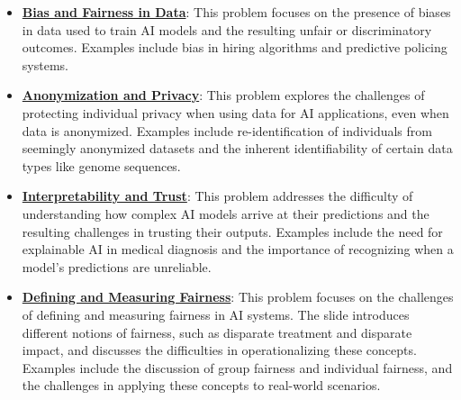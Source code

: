 \documentclass{article}%
\begin{document}
\begin{itemize}[leftmargin=*]%
\item \href{https://purdue.brightspace.com/d2l/common/assets/pdfjs-d2l-dist/1.0.14-legacy/web/viewer.html?file=\%2Fcontent\%2Fenforced\%2F1095467-wl.202510.CS.24300.001\%2F16L2-ethics.pdf\%3Fou\%3D1095467\&lang=en-us\&container=d2l-fileviewer-rendered-pdf\&fullscreen=d2l-fileviewer-rendered-pdf-dialog\&height=667#page=2}{\textbf{Bias and Fairness in Data}}: This problem focuses on the presence of biases in data used to train AI models and the resulting unfair or discriminatory outcomes. Examples include bias in hiring algorithms and predictive policing systems.%
\item \href{https://purdue.brightspace.com/d2l/common/assets/pdfjs-d2l-dist/1.0.14-legacy/web/viewer.html?file=\%2Fcontent\%2Fenforced\%2F1095467-wl.202510.CS.24300.001\%2F16L2-ethics.pdf\%3Fou\%3D1095467\&lang=en-us\&container=d2l-fileviewer-rendered-pdf\&fullscreen=d2l-fileviewer-rendered-pdf-dialog\&height=667#page=10}{\textbf{Anonymization and Privacy}}: This problem explores the challenges of protecting individual privacy when using data for AI applications, even when data is anonymized. Examples include re-identification of individuals from seemingly anonymized datasets and the inherent identifiability of certain data types like genome sequences.%
\item \href{https://purdue.brightspace.com/d2l/common/assets/pdfjs-d2l-dist/1.0.14-legacy/web/viewer.html?file=\%2Fcontent\%2Fenforced\%2F1095467-wl.202510.CS.24300.001\%2F16L2-ethics.pdf\%3Fou\%3D1095467\&lang=en-us\&container=d2l-fileviewer-rendered-pdf\&fullscreen=d2l-fileviewer-rendered-pdf-dialog\&height=667#page=28}{\textbf{Interpretability and Trust}}: This problem addresses the difficulty of understanding how complex AI models arrive at their predictions and the resulting challenges in trusting their outputs. Examples include the need for explainable AI in medical diagnosis and the importance of recognizing when a model's predictions are unreliable.%
\item \href{https://purdue.brightspace.com/d2l/common/assets/pdfjs-d2l-dist/1.0.14-legacy/web/viewer.html?file=\%2Fcontent\%2Fenforced\%2F1095467-wl.202510.CS.24300.001\%2F16L2-ethics.pdf\%3Fou\%3D1095467\&lang=en-us\&container=d2l-fileviewer-rendered-pdf\&fullscreen=d2l-fileviewer-rendered-pdf-dialog\&height=667#page=19}{\textbf{Defining and Measuring Fairness}}: This problem focuses on the challenges of defining and measuring fairness in AI systems. The slide introduces different notions of fairness, such as disparate treatment and disparate impact, and discusses the difficulties in operationalizing these concepts. Examples include the discussion of group fairness and individual fairness, and the challenges in applying these concepts to real-world scenarios.%

\end{itemize}
\end{document}
